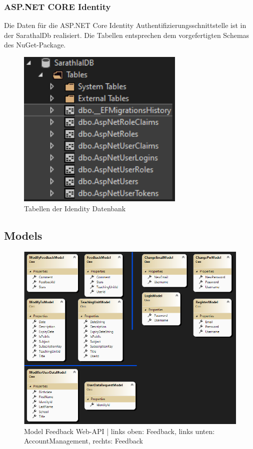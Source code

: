 \subsubsection{ASP.NET CORE Identity}
Die Daten für die ASP.NET Core Identity Authentifizierungsschnittstelle ist in der SarathalDb realisiert. Die Tabellen 
entsprechen dem vorgefertigten Schemas des NuGet-Package.

\begin{figure}[h]
    \begin{center}
        \includegraphics[width=8cm]{./pics/identity_tables.png}
        \caption[Identity Tables]{Tabellen der Idendity Datenbank}
    \end{center}
\end{figure}

\newpage
\subsection{Models}
\begin{figure}[h]
    \begin{center}
        \includegraphics*[width=15cm]{./pics/models_FeedbackWebAPI.png}
        \caption[models API]{Model Feedback Web-API | links oben: Feedback, links unten: AccountManagement, rechts: Feedback}
    \end{center}
\end{figure}

